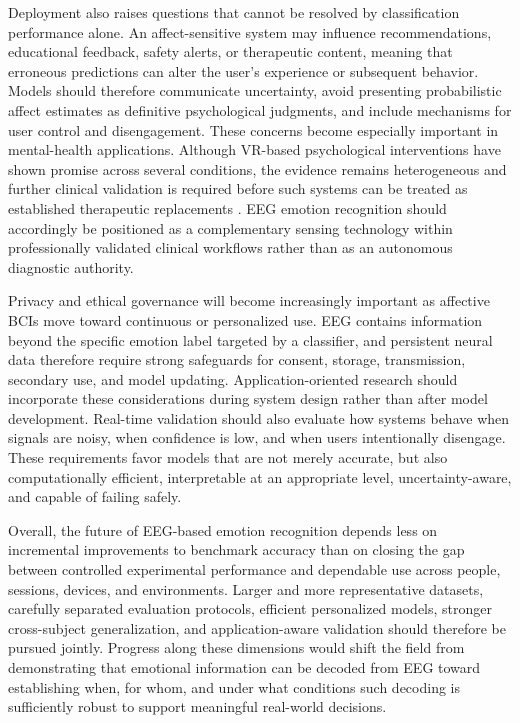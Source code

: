 \documentclass{WileyMSP-template}
\begin{document}
Deployment also raises questions that cannot be resolved by classification performance alone. An affect-sensitive system may influence recommendations, educational feedback, safety alerts, or therapeutic content, meaning that erroneous predictions can alter the user's experience or subsequent behavior. Models should therefore communicate uncertainty, avoid presenting probabilistic affect estimates as definitive psychological judgments, and include mechanisms for user control and disengagement. These concerns become especially important in mental-health applications. Although VR-based psychological interventions have shown promise across several conditions, the evidence remains heterogeneous and further clinical validation is required before such systems can be treated as established therapeutic replacements \cite{lipira2023vrmentalhealth}. EEG emotion recognition should accordingly be positioned as a complementary sensing technology within professionally validated clinical workflows rather than as an autonomous diagnostic authority.

Privacy and ethical governance will become increasingly important as affective BCIs move toward continuous or personalized use. EEG contains information beyond the specific emotion label targeted by a classifier, and persistent neural data therefore require strong safeguards for consent, storage, transmission, secondary use, and model updating. Application-oriented research should incorporate these considerations during system design rather than after model development. Real-time validation should also evaluate how systems behave when signals are noisy, when confidence is low, and when users intentionally disengage. These requirements favor models that are not merely accurate, but also computationally efficient, interpretable at an appropriate level, uncertainty-aware, and capable of failing safely.

Overall, the future of EEG-based emotion recognition depends less on incremental improvements to benchmark accuracy than on closing the gap between controlled experimental performance and dependable use across people, sessions, devices, and environments. Larger and more representative datasets, carefully separated evaluation protocols, efficient personalized models, stronger cross-subject generalization, and application-aware validation should therefore be pursued jointly. Progress along these dimensions would shift the field from demonstrating that emotional information can be decoded from EEG toward establishing when, for whom, and under what conditions such decoding is sufficiently robust to support meaningful real-world decisions.
\end{document}
